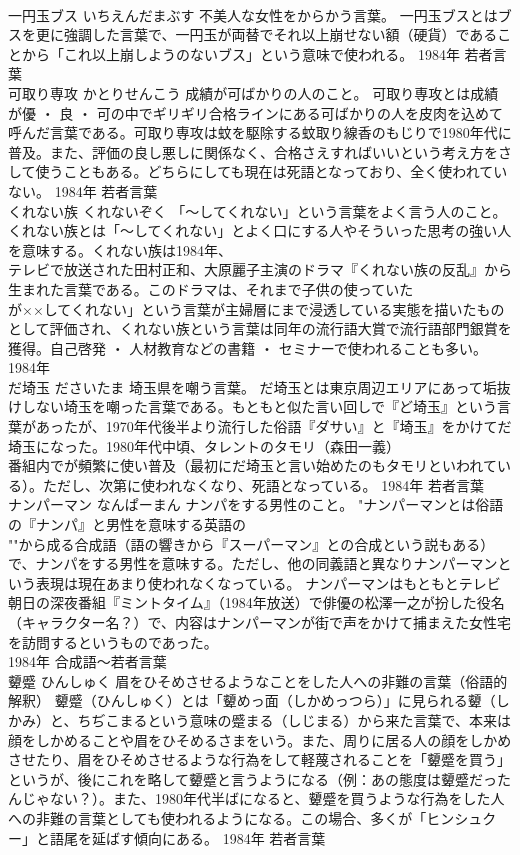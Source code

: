 \documentclass[8pt]{extreport}
\begin{document}
\begin{CJK}{UTF8}{min}
\\	一円玉ブス	いちえんだまぶす	不美人な女性をからかう言葉。	一円玉ブスとはブスを更に強調した言葉で、一円玉が両替でそれ以上崩せない額（硬貨）であることから「これ以上崩しようのないブス」という意味で使われる。	1984年	若者言葉	
\\	可取り専攻	かとりせんこう	成績が可ばかりの人のこと。	可取り専攻とは成績が優 ・ 良 ・ 可の中でギリギリ合格ラインにある可ばかりの人を皮肉を込めて呼んだ言葉である。可取り専攻は蚊を駆除する蚊取り線香のもじりで1980年代に普及。また、評価の良し悪しに関係なく、合格さえすればいいという考え方をさして使うこともある。どちらにしても現在は死語となっており、全く使われていない。	1984年	若者言葉	
\\	くれない族	くれないぞく	「～してくれない」という言葉をよく言う人のこと。	くれない族とは「～してくれない」とよく口にする人やそういった思考の強い人を意味する。くれない族は1984年、
\\	テレビで放送された田村正和、大原麗子主演のドラマ『くれない族の反乱』から生まれた言葉である。このドラマは、それまで子供の使っていた
\\	が××してくれない」という言葉が主婦層にまで浸透している実態を描いたものとして評価され、くれない族という言葉は同年の流行語大賞で流行語部門銀賞を獲得。自己啓発 ・ 人材教育などの書籍 ・ セミナーで使われることも多い。	1984年	
\\	だ埼玉	ださいたま	埼玉県を嘲う言葉。	だ埼玉とは東京周辺エリアにあって垢抜けしない埼玉を嘲った言葉である。もともと似た言い回しで『ど埼玉』という言葉があったが、1970年代後半より流行した俗語『ダサい』と『埼玉』をかけてだ埼玉になった。1980年代中頃、タレントのタモリ（森田一義）
\\	番組内でが頻繁に使い普及（最初にだ埼玉と言い始めたのもタモリといわれている）。ただし、次第に使われなくなり、死語となっている。	1984年	若者言葉	
\\	ナンパーマン	なんぱーまん	ナンパをする男性のこと。	"ナンパーマンとは俗語の『ナンパ』と男性を意味する英語の
\\	""から成る合成語（語の響きから『スーパーマン』との合成という説もある）で、ナンパをする男性を意味する。ただし、他の同義語と異なりナンパーマンという表現は現在あまり使われなくなっている。 ナンパーマンはもともとテレビ朝日の深夜番組『ミントタイム』（1984年放送）で俳優の松澤一之が扮した役名（キャラクター名？）で、内容はナンパーマンが街で声をかけて捕まえた女性宅を訪問するというものであった。
\\	1984年	合成語～若者言葉	
\\	顰蹙	ひんしゅく	眉をひそめさせるようなことをした人への非難の言葉（俗語的解釈）	顰蹙（ひんしゅく）とは「顰めっ面（しかめっつら）」に見られる顰（しかみ）と、ちぢこまるという意味の蹙まる（しじまる）から来た言葉で、本来は顔をしかめることや眉をひそめるさまをいう。また、周りに居る人の顔をしかめさせたり、眉をひそめさせるような行為をして軽蔑されることを「顰蹙を買う」というが、後にこれを略して顰蹙と言うようになる（例：あの態度は顰蹙だったんじゃない？）。また、1980年代半ばになると、顰蹙を買うような行為をした人への非難の言葉としても使われるようになる。この場合、多くが「ヒンシュクー」と語尾を延ばす傾向にある。	1984年	若者言葉	

\end{CJK}
\end{document}
